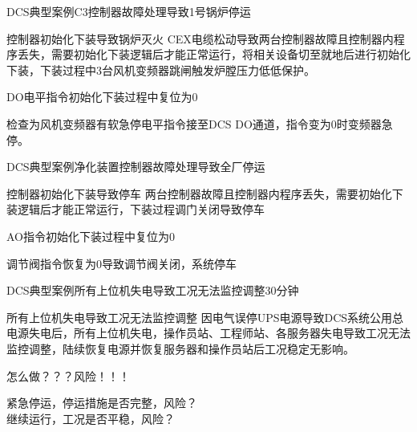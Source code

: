 \documentclass[12pt,hyperref={CJKbookmarks=true}]{beamer} %
\begin{document}
\begin{frame}{DCS典型案例}{C3控制器故障处理导致1号锅炉停运}
\begin{block}{\heiti 控制器初始化下装导致锅炉灭火}
			CEX电缆松动导致两台控制器故障且控制器内程序丢失，需要初始化下装逻辑后才能正常运行，将相关设备切至就地后进行初始化下装，下装过程中3台风机变频器跳闸触发炉膛压力低低保护。
		\end{block}
\pause
\begin{alertblock}{\heiti DO电平指令初始化下装过程中复位为0}
			
				检查为风机变频器有软急停电平指令接至DCS DO通道，指令变为0时变频器急停。
			
		
		\end{alertblock}
\end{frame}
\begin{frame}{DCS典型案例}{净化装置控制器故障处理导致全厂停运}
\begin{block}{\heiti 控制器初始化下装导致停车}
			两台控制器故障且控制器内程序丢失，需要初始化下装逻辑后才能正常运行，下装过程调门关闭导致停车
		\end{block}
\pause
\begin{alertblock}{\heiti AO指令初始化下装过程中复位为0}
			
				调节阀指令恢复为0导致调节阀关闭，系统停车
			
		
		\end{alertblock}
\end{frame}
\begin{frame}{DCS典型案例}{所有上位机失电导致工况无法监控调整30分钟}
\begin{block}{\heiti 所有上位机失电导致工况无法监控调整}
			因电气误停UPS电源导致DCS系统公用总电源失电后，所有上位机失电，操作员站、工程师站、各服务器失电导致工况无法监控调整，陆续恢复电源并恢复服务器和操作员站后工况稳定无影响。
		\end{block}
\pause
\begin{alertblock}{\heiti 怎么做？？？风险！！！
}
			
				紧急停运，停运措施是否完整，风险？\\继续运行，工况是否平稳，风险？
			
		
		\end{alertblock}
\end{frame}
\end{document}
